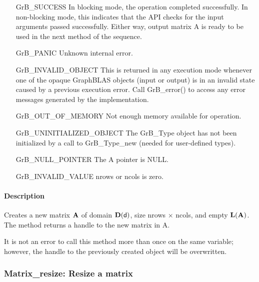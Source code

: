 \begin{itemize}[leftmargin=2.1in]
    \item[{\sf GrB\_SUCCESS}]         In blocking mode, the operation completed
    successfully. In non-blocking mode, this indicates that the API checks 
    for the input arguments passed successfully. Either way, output matrix 
    {\sf A} is ready to be used in the next method of the sequence.

    \item[{\sf GrB\_PANIC}]           Unknown internal error.
    
    \item[{\sf GrB\_INVALID\_OBJECT}] This is returned in any execution mode 
    whenever one of the opaque GraphBLAS objects (input or output) is in an invalid 
    state caused by a previous execution error.  Call {\sf GrB\_error()} to access 
    any error messages generated by the implementation.

    \item[{\sf GrB\_OUT\_OF\_MEMORY}] Not enough memory available for operation.
    
    \item[{\sf GrB\_UNINITIALIZED\_OBJECT}]  The {\sf GrB\_Type} object has not 
    been initialized by a call to {\sf GrB\_Type\_new} (needed for user-defined types).
    
    \item[{\sf GrB\_NULL\_POINTER}]  The {\sf A} pointer is {\sf NULL}.
    
    \item[{\sf GrB\_INVALID\_VALUE}] {\sf nrows} or {\sf ncols} is zero.
\end{itemize}

\paragraph{Description}

Creates a new matrix ${\bf A}$ of domain $\mathbf{D}({\sf d})$, size 
{\sf nrows $\times$ ncols}, and empty $\mathbf{L}({\bf A})$. The method returns a
handle to the new matrix in {\sf A}.

It is not an error to call this method more than once on the same variable;  
however, the handle to the previously created object will be overwritten. 

\subsubsection{{\sf Matrix\_resize}: Resize a matrix}


